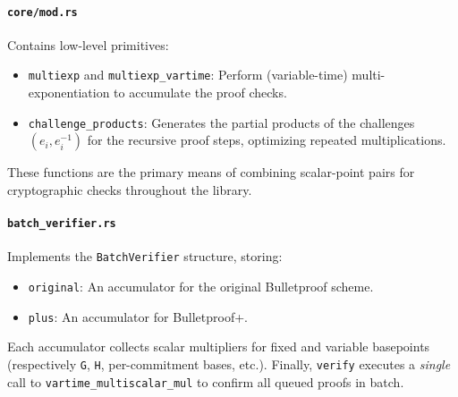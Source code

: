 \paragraph{\texttt{core/mod.rs}}
Contains low-level primitives:
\begin{itemize}
    \item \texttt{multiexp} and \texttt{multiexp\_vartime}: Perform (variable-time) multi-exponentiation to accumulate the proof checks. %
    \item \texttt{challenge\_products}: Generates the partial products of the challenges $(e_i, e_i^{-1})$ for the recursive proof steps, optimizing repeated multiplications. %
\end{itemize}

These functions are the primary means of combining scalar-point pairs for cryptographic checks throughout the library.  

\paragraph{\texttt{batch\_verifier.rs}}
Implements the \texttt{BatchVerifier} structure, storing:
\begin{itemize}
    \item \texttt{original}: An accumulator for the original Bulletproof scheme. %
    \item \texttt{plus}: An accumulator for Bulletproof+. %
\end{itemize}

Each accumulator collects scalar multipliers for fixed and variable basepoints (respectively \texttt{G}, \texttt{H}, per-commitment bases, etc.).  Finally, \texttt{verify} executes a \emph{single} call to \texttt{vartime\_multiscalar\_mul} to confirm all queued proofs in batch.  

